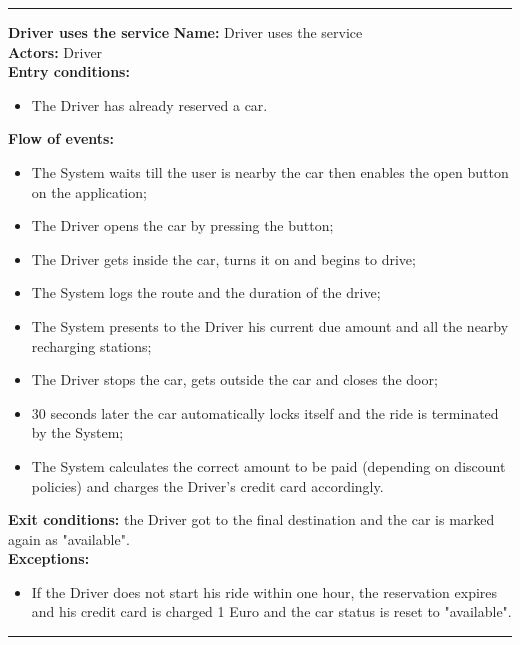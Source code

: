 \begin{center}
\noindent\rule{8cm}{1.0pt}
\end{center}


\textbf{\large Driver uses the service}
\bigbreak
\textbf{Name:} Driver uses the service\\
\textbf{Actors:} Driver \\
\textbf{Entry conditions:} 
\begin{itemize}
\item The Driver has already reserved a car.
\end{itemize}
\textbf{Flow of events:} 
\begin{itemize}
\item The System waits till the user is nearby the car then enables the open button on the application;
\item The Driver opens the car by pressing the button;
\item The Driver gets inside the car, turns it on and begins to drive;
\item The System logs the route and the duration of the drive;
\item The System presents to the Driver his current due amount and all the nearby recharging stations;
\item The Driver stops the car, gets outside the car and closes the door;
\item 30 seconds later the car automatically locks itself and the ride is terminated by the System;
\item The System calculates the correct amount to be paid (depending on discount policies) and charges the Driver's credit card accordingly.
\end{itemize}
\textbf{Exit conditions:} the Driver got to the final destination and the car is marked again as "available".\\
\textbf{Exceptions:}  
\begin{itemize}
\item If the Driver does not start his ride within one hour, the reservation expires and his credit card is charged 1 Euro and the car status is reset to "available". 
\end{itemize}

\begin{center}
\noindent\rule{8cm}{1.0pt}
\end{center}


